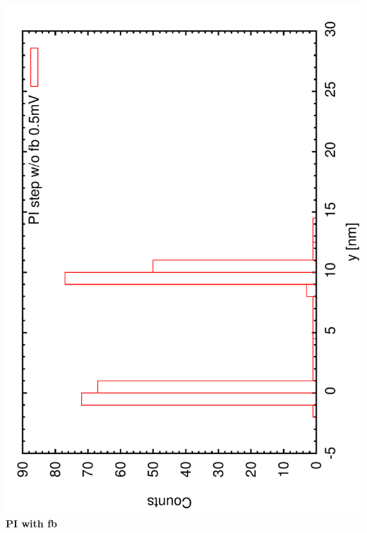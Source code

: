 \documentclass[a4paper,11pt]{book}
\begin{document}
\includegraphics[angle=-90,scale=0.15]{imagestep21a.pdf}\\
\textbf{PI with  fb}\\
\end{document}
